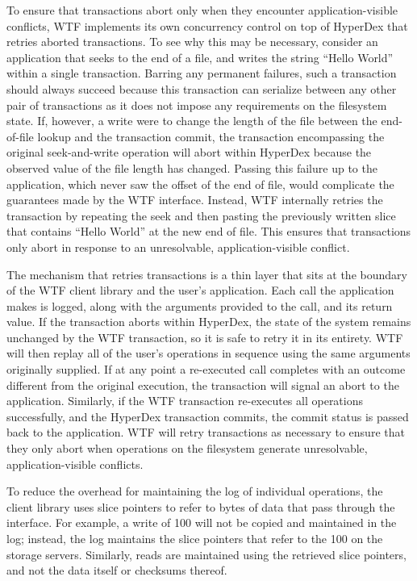 \documentclass[twocolumn,10pt,letterpaper]{article}
\begin{document}
To ensure that transactions abort only when they encounter application-visible
conflicts, WTF implements its own concurrency control on top of HyperDex that
retries aborted transactions.  To see why this may be necessary, consider an
application that seeks to the end of a file, and writes the string ``Hello
World'' within a single transaction.  Barring any permanent failures, such a
transaction should always succeed because this transaction can serialize between
any other pair of transactions as it does not impose any requirements on the
filesystem state.  If, however, a write were to change the length of the file
between the end-of-file lookup and the transaction commit, the transaction
encompassing the original seek-and-write operation will abort within HyperDex
because the observed value of the file length has changed.  Passing this failure
up to the application, which never saw the offset of the end of file, would
complicate the guarantees made by the WTF interface.  Instead, WTF internally
retries the transaction by repeating the seek and then pasting the previously
written slice that contains ``Hello World'' at the new end of file.  This
ensures that transactions only abort in response to an unresolvable,
application-visible conflict.

The mechanism that retries transactions is a thin layer that sits at the
boundary of the WTF client library and the user's application.  Each call the
application makes is logged, along with the arguments provided to the call, and
its return value.  If the transaction aborts within HyperDex, the state of the
system remains unchanged by the WTF transaction, so it is safe to retry it in
its entirety.  WTF will then replay all of the user's operations in sequence
using the same arguments originally supplied.  If at any point a re-executed
call completes with an outcome different from the original execution, the
transaction will signal an abort to the application.  Similarly, if the WTF
transaction re-executes all operations successfully, and the HyperDex
transaction commits, the commit status is passed back to the application.  WTF
will retry transactions as necessary to ensure that they only abort when
operations on the filesystem generate unresolvable, application-visible
conflicts.

To reduce the overhead for maintaining the log of individual operations, the
client library uses slice pointers to refer to bytes of data that pass through
the interface.  For example, a write of \unit{100}{\mega\byte} will not be
copied and maintained in the log; instead, the log maintains the slice pointers
that refer to the \unit{100}{\mega\byte} on the storage servers.  Similarly,
reads are maintained using the retrieved slice pointers, and not the data itself
or checksums thereof.
\end{document}
